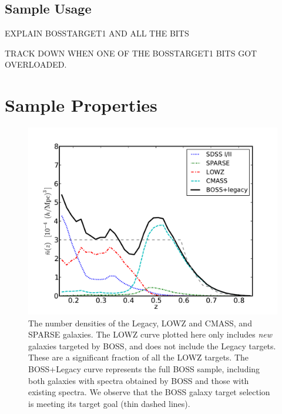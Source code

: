 \documentclass[preprint]{aastex}
\begin{document}
\subsection{Sample Usage}

EXPLAIN BOSSTARGET1 AND ALL THE BITS

TRACK DOWN WHEN ONE OF THE BOSSTARGET1 BITS GOT OVERLOADED.

\section{Sample Properties}

\begin{figure}
\includegraphics[width=0.95\columnwidth]{plots/nbarz-40-chunk6-21-CMASS_LOWZ_SPARSE}
\caption{The number densities of the Legacy, LOWZ and CMASS, and SPARSE 
galaxies. The LOWZ curve plotted here only includes {\it new} galaxies targeted
by BOSS, and does not include the Legacy targets. These are a
significant fraction of all the LOWZ targets. The BOSS+Legacy curve represents
the full BOSS sample, including both galaxies with spectra obtained by BOSS and
those with existing spectra. We observe that the BOSS galaxy target selection is
meeting its target goal (thin dashed lines).}
\label{fig:nbar}
\end{figure}
\end{document}
